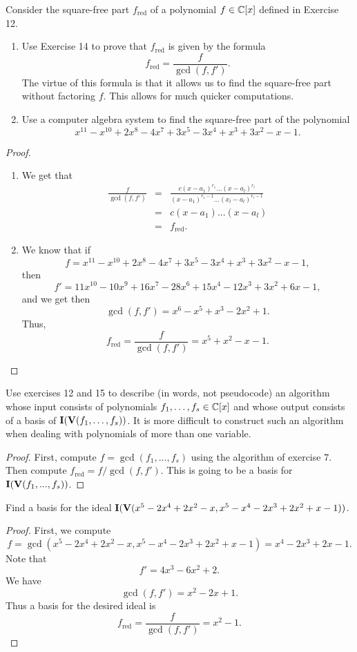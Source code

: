 \begin{exercise}{15}
Consider the square-free part $f_{\text{red}}$ of a polynomial $f\in\mathbb{C}[x]$ defined in Exercise 12.
\begin{enumerate}
    \item Use Exercise 14 to prove that $f_{\text{red}}$ is given by the formula
    \[
    f_{\text{red}} =\frac{f}{\gcd(f,f')}.
    \]
    The virtue of this formula is that it allows us to find the square-free part without factoring $f$. This allows for much quicker computations.
    \item Use a computer algebra system to find the square-free part of the polynomial 
    \[
    x^{11}-x^{10}+2x^8-4x^7+3x^5-3x^4+x^3+3x^2-x-1.
    \]
\end{enumerate}
\end{exercise}
\begin{proof}
\begin{enumerate}
    \item We get that
    \begin{eqnarray*}
        \frac{f}{\gcd(f,f')}
        & = & \frac{c(x-a_1)^{r_1} ... (x-a_l)^{r_l}}{(x-a_1)^{r_1 - 1} ... (x_l - a_l)^{r_l - 1}}\\
        & = & c(x -a_1) ... (x - a_l)\\
        & = & f_{\text{red}}.
    \end{eqnarray*}
    \item We know that if
    $$f = x^{11}-x^{10}+2x^8-4x^7+3x^5-3x^4+x^3+3x^2-x-1,$$
    then
    $$f' = 11x^{10} - 10x^9 + 16x^7 - 28x^6 + 15x^4 - 12x^3 + 3x^2 + 6x - 1,$$
    and we get then
    $$\gcd(f,f') = x^6 - x^5 + x^3 - 2x^2 + 1.$$
    Thus,
    $$f_{\text{red}} = \frac{f}{\gcd(f,f')} = x^5 + x^2 - x - 1.$$
\end{enumerate}
\end{proof}

\begin{exercise}{16}
Use exercises 12 and 15 to describe (in words, not pseudocode) an algorithm whose input consists of polynomials $f_1,\dots,f_s\in\mathbb{C}[x]$ and whose output consists of a basis of $\mathbf{I}(\mathbf{V}(f_1,\dots,f_s))$. It is more difficult to construct such an algorithm when dealing with polynomials of more than one variable.
\end{exercise}
\begin{proof}
First, compute $f = \gcd(f_1,...,f_s)$ using the algorithm of exercise $7$. Then compute $f_{\text{red}} = f/\gcd(f,f')$. This is going to be a basis for $\mathbf{I}(\mathbf{V}(f_1,...,f_s))$. 
\end{proof}

\begin{exercise}{17}
Find a basis for the ideal $\mathbf{I}(\mathbf{V}(x^5-2x^4+2x^2-x, x^5-x^4-2x^3+2x^2+x-1))$.
\end{exercise}
\begin{proof}
First, we compute
$$f = \gcd(x^5-2x^4+2x^2-x, x^5-x^4-2x^3+2x^2+x-1) = x^4 - 2x^3 + 2x - 1.$$
Note that
$$f' = 4x^3 - 6x^2 + 2.$$
We have
$$\gcd(f,f') = x^2 - 2x + 1.$$
Thus a basis for the desired ideal is
$$f_{\text{red}} = \frac{f}{\gcd(f,f')} = x^2 - 1.$$
\end{proof}